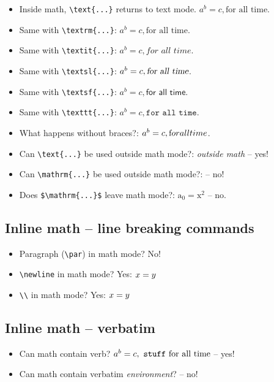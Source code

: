 \documentclass[a4paper]{article}
\begin{document}
\begin{itemize}\itemsep0pt
\item
Inside math, \verb!\text{...}! returns to text mode. $a^b = c, \text{for all time}$.
\item
Same with \verb!\textrm{...}!: $a^b = c, \textrm{for all time}$.
\item
Same with \verb!\textit{...}!: $a^b = c, \textit{for all time}$.
\item
Same with \verb!\textsl{...}!: $a^b = c, \textsl{for all time}$.
\item
Same with \verb!\textsf{...}!: $a^b = c, \textsf{for all time}$.
\item
Same with \verb!\texttt{...}!: $a^b = c, \texttt{for all time}$.
\item
What happens without braces?: $a^b = c, \text for all time $.
\item
Can \verb!\text{...}! be used outside math mode?: \textit{outside math} -- yes!
\item
Can \verb!\mathrm{...}! be used outside math mode?: %
-- no!
\item
Does \verb!$\mathrm{...}$! leave math mode?: $\mathrm{a_0 = x^2}$ -- no.
\end{itemize}


\subsection{Inline math -- line breaking commands}

\begin{itemize}\itemsep0pt
\item
Paragraph (\verb!\par!) in math mode? No! %
\item
\verb!\newline! in math mode? Yes:  $x = \newline y$
\item
\verb!\\! in math mode? Yes:  $x = \\ y$
\end{itemize}



\subsection{Inline math -- verbatim}

\begin{itemize}\itemsep0pt
\item
Can math contain verb? $a^b = c,\ \verb!stuff!\ \text{for all time}$ -- yes!
\item
Can math contain verbatim \emph{environment}?
-- no!
\end{itemize}
\end{document}
